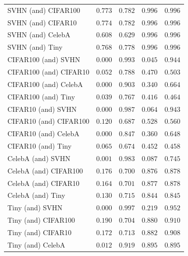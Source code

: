 \begin{tabularx}{\textwidth}{l*{4}{Y}}
{\scriptsize SVHN (and) CIFAR100} & $0.773$ & $0.782$ &$0.996$ & $0.996$ \\ 
{\scriptsize SVHN (and) CIFAR10} & $0.774$ & $0.782$ &$0.996$ & $0.996$ \\ 
{\scriptsize SVHN (and) CelebA} & $0.608$ & $0.629$ &$0.996$ & $0.996$ \\ 
{\scriptsize SVHN (and) Tiny} & $0.768$ & $0.778$ &$0.996$ & $0.996$ \\ 
{\scriptsize CIFAR100 (and) SVHN} & $\mathbf{0.000}$ & $\mathbf{0.993}$ &$\mathbf{0.045}$ & $\mathbf{0.944}$ \\ 
{\scriptsize CIFAR100 (and) CIFAR10} & $\mathbf{0.052}$ & $\mathbf{0.788}$ &$0.470$ & $0.503$ \\ 
{\scriptsize CIFAR100 (and) CelebA} & $\mathbf{0.000}$ & $\mathbf{0.903}$ &$\mathbf{0.340}$ & $\mathbf{0.664}$ \\ 
{\scriptsize CIFAR100 (and) Tiny} & $\mathbf{0.039}$ & $\mathbf{0.767}$ &$\mathbf{0.416}$ & $\mathbf{0.464}$ \\ 
{\scriptsize CIFAR10 (and) SVHN} & $\mathbf{0.000}$ & $\mathbf{0.987}$ &$\mathbf{0.064}$ & $\mathbf{0.943}$ \\ 
{\scriptsize CIFAR10 (and) CIFAR100} & $\mathbf{0.120}$ & $\mathbf{0.687}$ &$0.528$ & $0.560$ \\ 
{\scriptsize CIFAR10 (and) CelebA} & $\mathbf{0.000}$ & $\mathbf{0.847}$ &$\mathbf{0.360}$ & $\mathbf{0.648}$ \\ 
{\scriptsize CIFAR10 (and) Tiny} & $\mathbf{0.065}$ & $\mathbf{0.674}$ &$0.452$ & $0.458$ \\ 
{\scriptsize CelebA (and) SVHN} & $\mathbf{0.001}$ & $\mathbf{0.983}$ &$\mathbf{0.087}$ & $\mathbf{0.745}$ \\ 
{\scriptsize CelebA (and) CIFAR100} & $\mathbf{0.176}$ & $\mathbf{0.700}$ &$0.876$ & $0.878$ \\ 
{\scriptsize CelebA (and) CIFAR10} & $\mathbf{0.164}$ & $\mathbf{0.701}$ &$0.877$ & $0.878$ \\ 
{\scriptsize CelebA (and) Tiny} & $\mathbf{0.130}$ & $\mathbf{0.715}$ &$0.844$ & $0.845$ \\ 
{\scriptsize Tiny (and) SVHN} & $\mathbf{0.000}$ & $\mathbf{0.997}$ &$\mathbf{0.219}$ & $\mathbf{0.952}$ \\ 
{\scriptsize Tiny (and) CIFAR100} & $\mathbf{0.190}$ & $\mathbf{0.704}$ &$0.880$ & $0.910$ \\ 
{\scriptsize Tiny (and) CIFAR10} & $\mathbf{0.172}$ & $\mathbf{0.713}$ &$0.882$ & $0.908$ \\ 
{\scriptsize Tiny (and) CelebA} & $\mathbf{0.012}$ & $\mathbf{0.919}$ &$0.895$ & $0.895$ \\ 

    \bottomrule
    \end{tabularx}
    